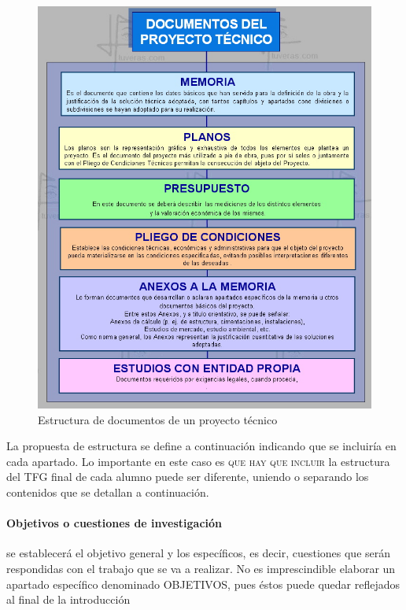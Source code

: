 \begin{figure}  
 	\begin{center}
        \includegraphics[scale = 0.45]{Figuras/documentos.jpg}
        	\end{center}
        \caption{Estructura de documentos de un proyecto técnico}
    \label{fig:report}
\end{figure}


La propuesta de estructura se define a continuación indicando que se incluiría en cada apartado. Lo importante en este caso es \textsc{que hay que incluir} la estructura del TFG final de cada alumno puede ser diferente, uniendo o separando los contenidos que se detallan a continuación. 

\paragraph{Objetivos o cuestiones de investigación}

se establecerá el objetivo general y los específicos, es decir, cuestiones que serán respondidas con el trabajo que se va a realizar. No es
imprescindible elaborar un apartado específico denominado OBJETIVOS, pues éstos puede quedar reflejados al final de la
introducción

